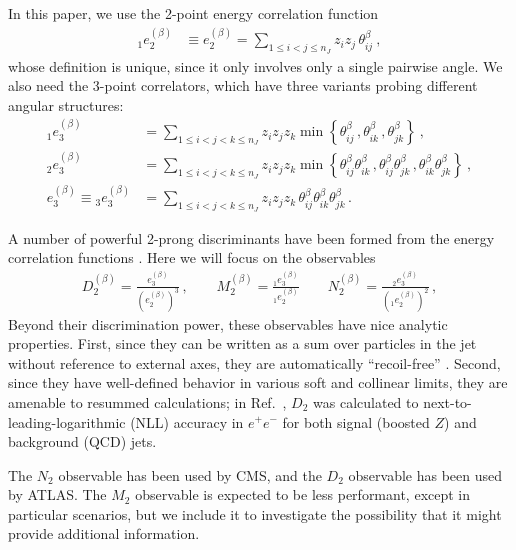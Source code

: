 \documentclass[11pt,letterpaper]{article}
\DeclareRobustCommand{\Ref}[1]{Ref.~\cite{#1}}
\newcommand{\ecf}[2]{e_{#1}^{(#2)}}
\newcommand{\ecfvar}[3]{{_{#1}e_{#2}^{(#3)}}}
\newcommand{\Dobs}[2]{D_{#1}^{(#2)}}
\newcommand{\Dobsnobeta}[1]{D_{#1}}
\begin{document}
In this paper, we use the 2-point energy correlation function
\begin{align}\label{eq:explicit_twopointvar}
\ecfvar{1}{2}{\beta}&\equiv\ecf{2}{\beta}=\sum_{1\leq i<j\leq n_J} z_{i}z_{j} \, \theta_{ij}^\beta\ ,
\end{align}
whose definition is unique, since it only involves only a single pairwise angle.  We also need the 3-point correlators, which have three variants probing different angular structures:
\begin{align}\label{eq:explicit_ecfvar}
\ecfvar{1}{3}{\beta}&=\sum_{1\leq i<j<k\leq n_J} z_{i}z_{j}z_{k} \min \left\{ \theta_{ij}^\beta\,,  \theta_{ik}^\beta\,, \theta_{jk}^\beta  \right\} \ , \nonumber \\
\ecfvar{2}{3}{\beta}&=\sum_{1\leq i<j<k\leq n_J} z_{i}z_{j}z_{k} \min \left\{\theta_{ij}^\beta \theta_{ik}^\beta\,, \theta_{ij}^\beta  \theta_{jk}^\beta\,,     \theta_{ik}^\beta \theta_{jk}^\beta    \right\}  \ , \nonumber \\
\ecf{3}{\beta}\equiv\ecfvar{3}{3}{\beta}&=\sum_{1\leq i<j<k\leq n_J} z_{i}z_{j}z_{k} \, \theta_{ij}^\beta \theta_{ik}^\beta \theta_{jk}^\beta \,.
\end{align}






 A number of powerful 2-prong discriminants have been formed from the energy correlation functions  \cite{Larkoski:2013eya,Larkoski:2014gra}. Here we will focus on the observables
\begin{align}
 \Dobs{2}{\beta}=\frac{\ecf{3}{\beta}}{(\ecf{2}{\beta})^{3}}\,, \qquad M_2^{(\beta)} = \frac{\ecfvar{1}{3}{\beta}}{\ecfvar{1}{2}{\beta}} \qquad  N_2^{(\beta)} = \frac{\ecfvar{2}{3}{\beta}}{(\ecfvar{1}{2}{\beta})^2}\,,
\end{align}
Beyond their discrimination power, these observables have nice analytic properties.  First, since they can be written as a sum over particles in the jet without reference to external axes, they are automatically ``recoil-free'' \cite{Catani:1992jc,Dokshitzer:1998kz,Banfi:2004yd,Larkoski:2013eya,Larkoski:2014uqa}. Second, since they have well-defined behavior in various soft and collinear limits, they are amenable to resummed calculations;  in \Ref{Larkoski:2015kga}, $\Dobsnobeta{2}$ was calculated to next-to-leading-logarithmic (NLL) accuracy in $e^+e^-$ for both signal (boosted $Z$) and background (QCD) jets. 

The $N_2$ observable has been used by CMS, and the $D_2$ observable has been used by ATLAS. The $M_2$ observable is expected to be less performant, except in particular scenarios, but we include it to investigate the possibility that it might provide additional information.
\end{document}
